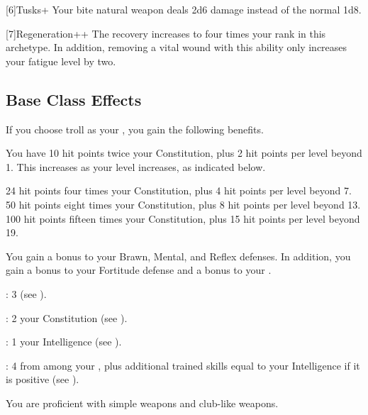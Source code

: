     [6]{Tusks+} Your bite natural weapon deals 2d6 damage instead of the normal 1d8.

    [7]{Regeneration++} The recovery increases to four times your rank in this archetype.
      In addition, removing a vital wound with this ability only increases your fatigue level by two.

  \subsection{Base Class Effects}
    \veryhighhpprogressiontable

    If you choose troll as your , you gain the following benefits.

      You have 10 hit points \add twice your Constitution, plus 2 hit points per level beyond 1.
      This increases as your level increases, as indicated below.
      \begin{raggeditemize}
         24 hit points \add four times your Constitution, plus 4 hit points per level beyond 7.
         50 hit points \add eight times your Constitution, plus 8 hit points per level beyond 13.
         100 hit points \add fifteen times your Constitution, plus 15 hit points per level beyond 19.
      \end{raggeditemize}

      You gain a  bonus to your Brawn, Mental, and Reflex defenses.
      In addition, you gain a  bonus to your Fortitude defense and a  bonus to your .

      \begin{raggeditemize}
          \item {}: 3 (see ).
          \item {}: 2 \add your Constitution (see ).
          \item {}: 1 \add your Intelligence (see ).
          \item {}: 4 from among your , plus additional trained skills equal to your Intelligence if it is positive (see ).
      \end{raggeditemize}

      You are proficient with simple weapons and club-like weapons.

